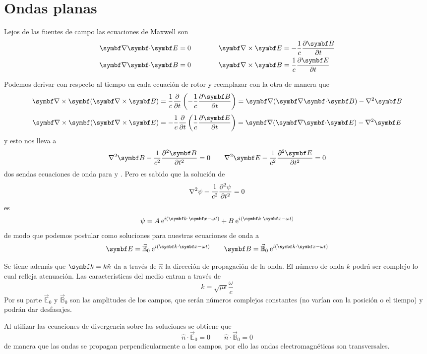 \documentclass[10pt,oneside]{CBFT_book}
\begin{document}
\chapter{Ondas planas}

Lejos de las fuentes de campo las ecuaciones de Maxwell son
\begin{align*}
	\divem{E} = 0 \qquad \qquad &\rotorm{E} = -\frac{1}{c}\dpar{\vb{B}}{t} \\
	\divem{B} = 0 \qquad \qquad &\rotorm{B} = \frac{1}{c}\dpar{\vb{E}}{t}
\end{align*}

Podemos derivar con respecto al tiempo en cada ecuación de rotor y reemplazar con la otra
de manera que
\[
	\rotorm{(\rotorm{B})} = \frac{1}{c}\dpar{}{t}\left(-\frac{1}{c}\dpar{\vb{B}}{t} \right)
	= \Nabla(\divem{B}) - \nabla^2 \vb{B}
\]
\[
	\rotorm{(\rotorm{E})} = -\frac{1}{c}\dpar{}{t}\left(\frac{1}{c}\dpar{\vb{E}}{t} \right)
	= \Nabla(\divem{E}) - \nabla^2 \vb{E}
\]
y esto nos lleva a 
\[
	\nabla^2 \vb{B} - \frac{1}{c^2}\dpar[2]{\vb{B}}{t} = 0 \qquad 
	\nabla^2 \vb{E} - \frac{1}{c^2}\dpar[2]{\vb{E}}{t} = 0
\]
dos sendas ecuaciones de onda para  y . Pero es sabido que la solución de
\[
	\nabla^2 \psi - \frac{1}{c^2} \dpar[2]{\psi}{t} = 0
\]
es
\[
	\psi = A\euler^{i(\pe{k}{x}-\omega t)} + B\euler^{i(\pe{k}{x}-\omega t)}
\]
de modo que podemos postular como soluciones para nuestras ecuaciones de onda a
\[
	\vb{E} = \vec{\mathbb{E}}_0 \euler^{i(\pe{k}{x}-\omega t)} \qquad 
	\vb{B} = \vec{\mathbb{B}}_0 \euler^{i(\pe{k}{x}-\omega t)}
\]

Se tiene además que $\vb{k} = k \hat{n}$ da a través de $\hat{n}$ la dirección de
propagación de la onda. El número de onda $k$ podrá ser complejo lo cual refleja
atenuación. Las características del medio entran a través de
\[
	k = \sqrt{\mu\epsilon} \frac{\omega}{c}
\]
Por su parte $\vec{\mathbb{E}}_0$ y $\vec{\mathbb{B}}_0$ son las amplitudes de los campos,
que serán números complejos constantes (no varían con la posición o el tiempo) y podrán
dar desfasajes.

Al utilizar las ecuaciones de divergencia sobre las soluciones se obtiene que 
\[
	\hat{n}\cdot \vec{\mathbb{E}}_0 = 0 \qquad \hat{n}\cdot \vec{\mathbb{B}}_0 = 0
\]
de manera que las ondas se propagan perpendicularmente a los campos, por ello las
ondas electromagnéticas son transversales.
\end{document}
